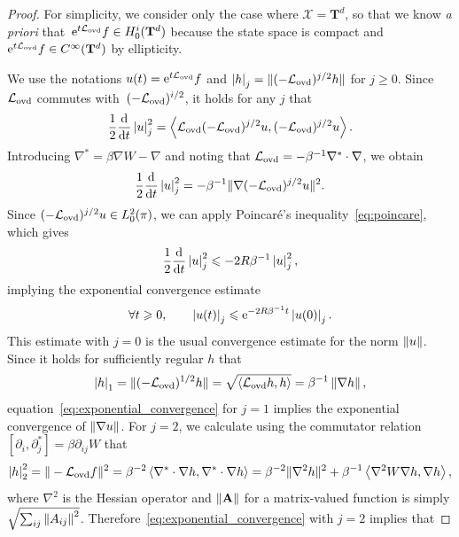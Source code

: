 \documentclass[11pt,a4paper]{article}
\newcommand{\e}{\mathrm{e}}
\newcommand{\commut}[2]{[#1, #2]}
\newcommand{\torus}{\mathbf T}
\newcommand{\grad}{\nabla}
\newcommand{\hess}{\nabla^2}
\newcommand{\vect}[1]{\boldsymbol{\mathbf #1}}
\newcommand{\mat}[1]{\vect #1}
\theoremstyle{plain}
\numberwithin{equation}{section}
\renewcommand{\leq}{\leqslant}
\renewcommand{\geq}{\geqslant}
\begin{document}
\begin{proof}
    For simplicity, we consider only the case where $\mathcal X = \torus^d$,
    so that we know \emph{a priori} that~$\e^{t \mathcal L_{\rm ovd}} f \in H^i_0(\torus^d)$ because
    the state space is compact and $\e^{t \mathcal L_{\rm ovd}} f \in C^{\infty}(\torus^d)$ by ellipticity.

    We use the notations $u(t) = \e^{t \mathcal L_{\rm ovd}} f$ and
     $\seminorm{h}_j = \norm*{(- \mathcal L_{\rm ovd})^{j/2} h}$ for $j \geq 0$.
    Since $\mathcal L_{\rm ovd}$ commutes with~$(-\mathcal L_{\rm ovd})^{i/2}$,
    it holds for any $j$ that
    \[
        \frac{1}{2} \derivative*{1}{t} \seminorm{u}_j^2 = \ip{\mathcal L_{\rm ovd} (-\mathcal L_{\rm ovd})^{j/2} u}{(- \mathcal L_{\rm ovd})^{j/2} u}.
    \]
    Introducing $\grad^* = \beta \grad W - \grad$
    and noting that $\mathcal L_{\rm ovd} = - \beta^{-1} \grad^* \cdot \grad$,
    we obtain
    \[
        \frac{1}{2} \derivative*{1}{t} \seminorm{u}_j^2 = - \beta^{-1} \norm*{\grad (-\mathcal L_{\rm ovd})^{j/2} u}^2.
    \]
    Since $(-\mathcal L_{\rm ovd})^{j/2} u \in L^2_0(\pi)$,
    we can apply Poincar\'e's inequality~\eqref{eq:poincare},
    which gives
    \[
        \frac{1}{2} \derivative*{1}{t} \seminorm{u}_j^2 \leq - 2R \beta^{-1} \seminorm{u}_j^2,
    \]
    implying the exponential convergence estimate
    \begin{equation}
        \label{eq:exponential_convergence}
        \forall t \geq 0, \qquad
        \seminorm{u(t)}_j \leq \e^{- 2 R \beta^{-1} t} \seminorm{u(0)}_j.
    \end{equation}
    This estimate with $j = 0$ is the usual convergence estimate for the norm $\norm{u}$.
    Since it holds for sufficiently regular $h$ that
    \[
        \seminorm{h}_1 = \norm*{(- \mathcal L_{\rm ovd})^{1/2} h} = \sqrt{\ip{\mathcal L_{\rm ovd} h}{h}} = \beta^{-1} \norm{\grad h},
    \]
    equation~\eqref{eq:exponential_convergence} for $j = 1$ implies the exponential convergence of $\norm{\grad u}$.
    For $j = 2$, we calculate using the commutator relation $\commut{\partial_i}{\partial_j^*} = \beta  \partial_{ij} W$ that
    \[
        \seminorm{h}_2^2 = \norm*{- \mathcal L_{\rm ovd}f}^2
        = \beta^{-2} \ip{\grad^* \cdot \grad h}{\grad^* \cdot \grad h}
        = \beta^{-2} \norm*{\grad^2 h}^2 + \beta^{-1} \ip{\hess W \grad h}{\grad h},
    \]
    where $\grad^2$ is the Hessian operator and $\norm{\mat A}$ for a matrix-valued function is simply $\sqrt{\sum_{ij} \norm{A_{ij}}^2}$.
    Therefore~\eqref{eq:exponential_convergence} with $j = 2$ implies that

\end{proof}
\end{document}
